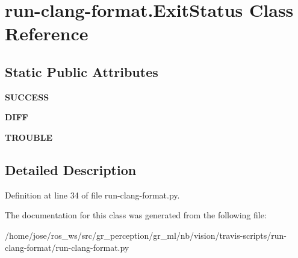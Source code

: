 \hypertarget{classrun-clang-format_1_1ExitStatus}{}\section{run-\/clang-\/format.Exit\+Status Class Reference}
\label{classrun-clang-format_1_1ExitStatus}
\subsection*{Static Public Attributes}
\begin{DoxyCompactItemize}
\item 
\mbox{\label{classrun-clang-format_1_1ExitStatus_ac65ddbe6c7af7fd3df845c840dbae958}} 
{\bfseries S\+U\+C\+C\+E\+SS}
\item 
\mbox{\label{classrun-clang-format_1_1ExitStatus_aff202b943f5ff78deed590af751f3e50}} 
{\bfseries D\+I\+FF}
\item 
\mbox{\label{classrun-clang-format_1_1ExitStatus_a0ed0248b68d09fbd0852c85bb9428a28}} 
{\bfseries T\+R\+O\+U\+B\+LE}
\end{DoxyCompactItemize}


\subsection{Detailed Description}


Definition at line 34 of file run-\/clang-\/format.\+py.



The documentation for this class was generated from the following file\+:\begin{DoxyCompactItemize}
\item 
/home/jose/ros\+\_\+ws/src/gr\+\_\+perception/gr\+\_\+ml/nb/vision/travis-\/scripts/run-\/clang-\/format/run-\/clang-\/format.\+py\end{DoxyCompactItemize}
